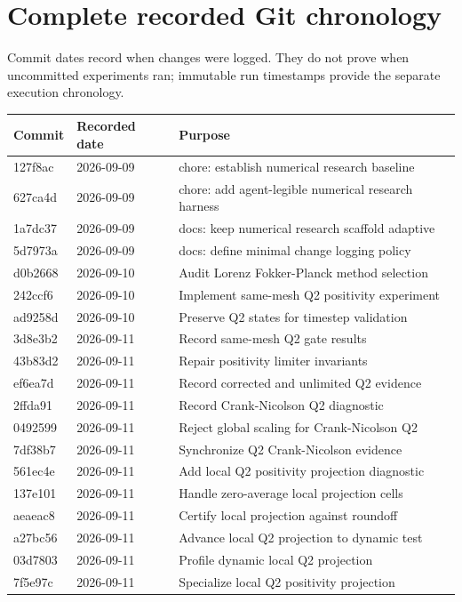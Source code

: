 \chapter{Complete recorded Git chronology}
\label{app:git}
Commit dates record when changes were logged. They do not prove when uncommitted experiments ran; immutable run timestamps provide the separate execution chronology.
\small
\begin{longtable}{p{}p{}p{}}
\toprule Commit & Recorded date & Purpose\\\midrule\endhead
127f8ac & 2026-09-09 & chore: establish numerical research baseline\\
627ca4d & 2026-09-09 & chore: add agent-legible numerical research harness\\
1a7dc37 & 2026-09-09 & docs: keep numerical research scaffold adaptive\\
5d7973a & 2026-09-09 & docs: define minimal change logging policy\\
d0b2668 & 2026-09-10 & Audit Lorenz Fokker-Planck method selection\\
242ccf6 & 2026-09-10 & Implement same-mesh Q2 positivity experiment\\
ad9258d & 2026-09-10 & Preserve Q2 states for timestep validation\\
3d8e3b2 & 2026-09-11 & Record same-mesh Q2 gate results\\
43b83d2 & 2026-09-11 & Repair positivity limiter invariants\\
ef6ea7d & 2026-09-11 & Record corrected and unlimited Q2 evidence\\
2ffda91 & 2026-09-11 & Record Crank-Nicolson Q2 diagnostic\\
0492599 & 2026-09-11 & Reject global scaling for Crank-Nicolson Q2\\
7df38b7 & 2026-09-11 & Synchronize Q2 Crank-Nicolson evidence\\
561ec4e & 2026-09-11 & Add local Q2 positivity projection diagnostic\\
137e101 & 2026-09-11 & Handle zero-average local projection cells\\
aeaeac8 & 2026-09-11 & Certify local projection against roundoff\\
a27bc56 & 2026-09-11 & Advance local Q2 projection to dynamic test\\
03d7803 & 2026-09-11 & Profile dynamic local Q2 projection\\
7f5e97c & 2026-09-11 & Specialize local Q2 positivity projection\\

\end{longtable}
